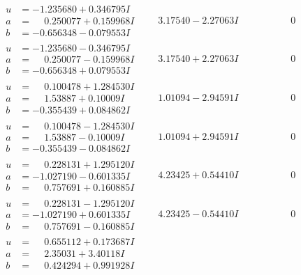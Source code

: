 \documentclass[1p]{elsarticle_modified}
\theoremstyle{definition}
\begin{document}
$$\begin{array}{c|c|c}
\begin{aligned}
u &= -1.235680 + 0.346795 I \\
a &= \phantom{-}0.250077 + 0.159968 I \\
b &= -0.656348 - 0.079553 I\end{aligned}
 & \phantom{-}3.17540 - 2.27063 I & \phantom{-0.000000 } 0 \\ \hline\begin{aligned}
u &= -1.235680 - 0.346795 I \\
a &= \phantom{-}0.250077 - 0.159968 I \\
b &= -0.656348 + 0.079553 I\end{aligned}
 & \phantom{-}3.17540 + 2.27063 I & \phantom{-0.000000 } 0 \\ \hline\begin{aligned}
u &= \phantom{-}0.100478 + 1.284530 I \\
a &= \phantom{-}1.53887 + 0.10009 I \\
b &= -0.355439 + 0.084862 I\end{aligned}
 & \phantom{-}1.01094 - 2.94591 I & \phantom{-0.000000 } 0 \\ \hline\begin{aligned}
u &= \phantom{-}0.100478 - 1.284530 I \\
a &= \phantom{-}1.53887 - 0.10009 I \\
b &= -0.355439 - 0.084862 I\end{aligned}
 & \phantom{-}1.01094 + 2.94591 I & \phantom{-0.000000 } 0 \\ \hline\begin{aligned}
u &= \phantom{-}0.228131 + 1.295120 I \\
a &= -1.027190 - 0.601335 I \\
b &= \phantom{-}0.757691 + 0.160885 I\end{aligned}
 & \phantom{-}4.23425 + 0.54410 I & \phantom{-0.000000 } 0 \\ \hline\begin{aligned}
u &= \phantom{-}0.228131 - 1.295120 I \\
a &= -1.027190 + 0.601335 I \\
b &= \phantom{-}0.757691 - 0.160885 I\end{aligned}
 & \phantom{-}4.23425 - 0.54410 I & \phantom{-0.000000 } 0 \\ \hline\begin{aligned}
u &= \phantom{-}0.655112 + 0.173687 I \\
a &= \phantom{-}2.35031 + 3.40118 I \\
b &= \phantom{-}0.424294 + 0.991928 I\end{aligned}

\end{array}$$
\end{document}
